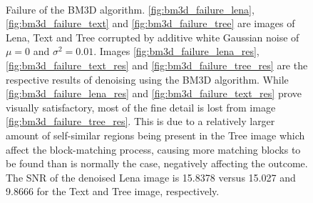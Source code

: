 \documentclass[12pt,notitlepage]{report}
\begin{document}
\begin{figure}[t]
	  ~
	  ~
  \caption[Failure of the BM3D algorithm]{Failure of the BM3D algorithm. \ref{fig:bm3d_failure_lena}, \ref{fig:bm3d_failure_text} and \ref{fig:bm3d_failure_tree} are images of Lena, Text and Tree corrupted by additive white Gaussian noise of $\mu = 0$ and $\sigma^2 = 0.01$. Images  \ref{fig:bm3d_failure_lena_res}, \ref{fig:bm3d_failure_text_res} and \ref{fig:bm3d_failure_tree_res} are the respective results of denoising using the BM3D algorithm. While \ref{fig:bm3d_failure_lena_res} and \ref{fig:bm3d_failure_text_res} prove visually satisfactory, most of the fine detail is lost from image \ref{fig:bm3d_failure_tree_res}. This is due to a relatively larger amount of self-similar regions being present in the Tree image which affect the block-matching process, causing more matching blocks to be found than is normally the case, negatively affecting the outcome. The SNR of the denoised Lena image is 15.8378 versus 15.027 and 9.8666 for the Text and Tree image, respectively.}
  \label{fig:bm3d_failure}
\end{figure}
\end{document}
